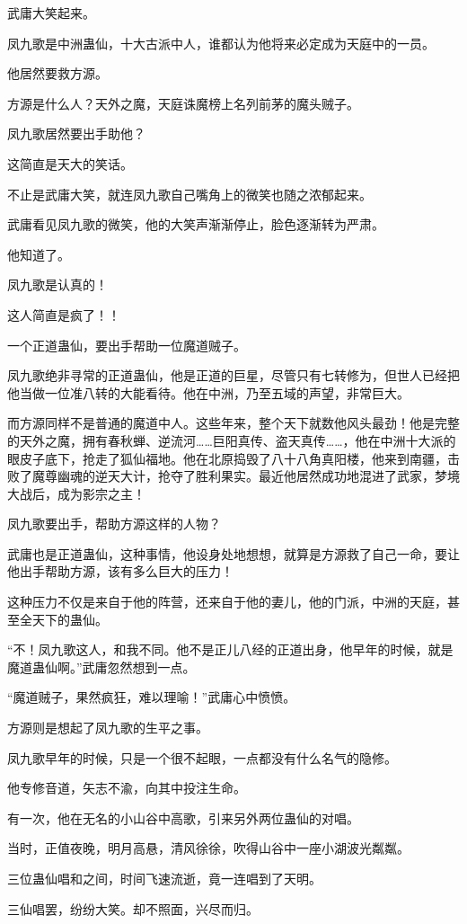 \begin{this_body}
武庸大笑起来。

凤九歌是中洲蛊仙，十大古派中人，谁都认为他将来必定成为天庭中的一员。

他居然要救方源。

方源是什么人？天外之魔，天庭诛魔榜上名列前茅的魔头贼子。

凤九歌居然要出手助他？

这简直是天大的笑话。

不止是武庸大笑，就连凤九歌自己嘴角上的微笑也随之浓郁起来。

武庸看见凤九歌的微笑，他的大笑声渐渐停止，脸色逐渐转为严肃。

他知道了。

凤九歌是认真的！

这人简直是疯了！！

一个正道蛊仙，要出手帮助一位魔道贼子。

凤九歌绝非寻常的正道蛊仙，他是正道的巨星，尽管只有七转修为，但世人已经把他当做一位准八转的大能看待。他在中洲，乃至五域的声望，非常巨大。

而方源同样不是普通的魔道中人。这些年来，整个天下就数他风头最劲！他是完整的天外之魔，拥有春秋蝉、逆流河……巨阳真传、盗天真传……，他在中洲十大派的眼皮子底下，抢走了狐仙福地。他在北原捣毁了八十八角真阳楼，他来到南疆，击败了魔尊幽魂的逆天大计，抢夺了胜利果实。最近他居然成功地混进了武家，梦境大战后，成为影宗之主！

凤九歌要出手，帮助方源这样的人物？

武庸也是正道蛊仙，这种事情，他设身处地想想，就算是方源救了自己一命，要让他出手帮助方源，该有多么巨大的压力！

这种压力不仅是来自于他的阵营，还来自于他的妻儿，他的门派，中洲的天庭，甚至全天下的蛊仙。

“不！凤九歌这人，和我不同。他不是正儿八经的正道出身，他早年的时候，就是魔道蛊仙啊。”武庸忽然想到一点。

“魔道贼子，果然疯狂，难以理喻！”武庸心中愤愤。

方源则是想起了凤九歌的生平之事。

凤九歌早年的时候，只是一个很不起眼，一点都没有什么名气的隐修。

他专修音道，矢志不渝，向其中投注生命。

有一次，他在无名的小山谷中高歌，引来另外两位蛊仙的对唱。

当时，正值夜晚，明月高悬，清风徐徐，吹得山谷中一座小湖波光粼粼。

三位蛊仙唱和之间，时间飞速流逝，竟一连唱到了天明。

三仙唱罢，纷纷大笑。却不照面，兴尽而归。


\end{this_body}

